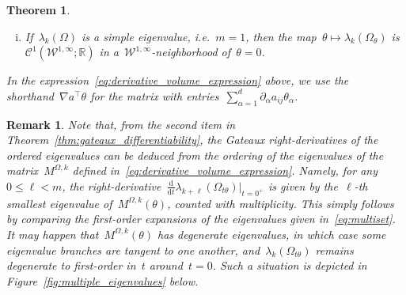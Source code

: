 \documentclass[a4]{article}
\renewcommand{\d}{\mathrm{d}}
\newcommand{\e}{\mathrm{e}}
\renewcommand{\div}{\mathrm{div}}
\newcommand{\R}{\mathbb{R}}
\newcommand{\1}{\mathbbm 1}
\newcommand{\Winf}{{{\cW}^{1,\infty}}}
\newcommand{\cW}{\mathcal{W}}
\newtheorem{theorem}{Theorem}
\newtheorem{remark}{Remark}
\begin{document}
\begin{theorem}
\begin{enumerate}[i)]
{        Moreover, the set~$\left\{\mu_\ell'(0),\,1\leq \ell\leq m\right\}$ of derivatives at~$t=0$ is the spectrum of the symmetric matrix~$M^{\Omega,k}(\theta)$ with entries, for~$1\leq i,j\leq m$:
        \begin{equation}
            \begin{aligned}
                \label{eq:derivative_volume_expression}
            M^{\Omega,k}_{ij}(\theta) = &\frac1\beta\int_\Omega \nabla u_k^{(i)}(\Omega)^\top \left(\nabla a^\top \theta -a\nabla \theta -\nabla\theta^\top a\right)\nabla u_k^{(j)}(\Omega)\e^{-\beta V}
            \\&+ \frac1\beta \int_\Omega \nabla u_k^{(i)}(\Omega)^\top a \nabla u_k^{(j)}(\Omega)\div\left(\theta\e^{-\beta V}\right)\\
            &-\lambda_k(\Omega)\int_\Omega u_k^{(i)}(\Omega)u_k^{(j)}(\Omega)\div\left(\theta\e^{-\beta V}\right).
        \end{aligned}
        \end{equation}
        }
        \item{
            If~$\lambda_k(\Omega)$ is a simple eigenvalue, i.e.~$m=1$, then the map~$\theta\mapsto \lambda_k(\Omega_\theta)$ is~$\mathcal C^1(\Winf;\R)$ in a~$\Winf$-neighborhood of~$\theta=0$.
        }
    \end{enumerate}
    In the expression~\eqref{eq:derivative_volume_expression} above, we use the shorthand~$\nabla a^\top \theta$ for the matrix with entries~$\sum_{\alpha=1}^d\partial_{\alpha}a_{ij}\theta_\alpha$.
\end{theorem}
\begin{remark}
    Note that, from the second item in Theorem~\ref{thm:gateaux_differentiability}, the Gateaux right-derivatives of the ordered eigenvalues can be deduced from the ordering of the eigenvalues of the matrix~$M^{\Omega,k}$ defined in~\eqref{eq:derivative_volume_expression}.
    Namely, for any~$0\leq \ell< m$, the right-derivative~$\frac{\d}{\d t}\lambda_{k+\ell}(\Omega_{t\theta})\big|_{t=0^+}$ is given by the~$\ell$-th smallest eigenvalue of~$M^{\Omega,k}(\theta)$, counted with multiplicity.
    This simply follows by comparing the first-order expansions of the eigenvalues given in~\eqref{eq:multiset}.
    It may happen that~$M^{\Omega,k}(\theta)$ has degenerate eigenvalues, in which case some eigenvalue branches are tangent to one another, and~$\lambda_{k}(\Omega_{t\theta})$ remains degenerate to first-order in~$t$ around~$t=0$.
    Such a situation is depicted in Figure~\ref{fig:multiple_eigenvalues} below.
\end{remark}
\end{document}
